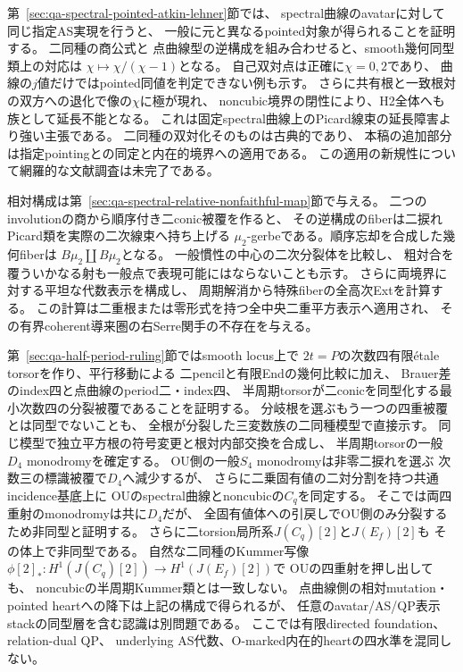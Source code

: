 \documentclass[a4paper,11pt]{ltjsarticle}
\numberwithin{equation}{section}
\theoremstyle{plain}
\theoremstyle{definition}
\theoremstyle{remark}
\begin{document}
第~\ref{sec:qa-spectral-pointed-atkin-lehner}節では、
spectral曲線のavatarに対して同じ指定AS実現を行うと、
一般に元と異なるpointed対象が得られることを証明する。
二同種の商公式\cite[III, Example~4.5]{SilvermanAEC2009}と
点曲線型の逆構成を組み合わせると、smooth幾何同型類上の対応は
$\chi\mapsto\chi/(\chi-1)$となる。
自己双対点は正確に$\chi=0,2$であり、
曲線の$j$値だけではpointed同値を判定できない例も示す。
さらに共有根と一致根対の双方への退化で像の$\chi$に極が現れ、
noncubic境界の閉性により、H2全体へも族として延長不能となる。
これは固定spectral曲線上のPicard線束の延長障害より強い主張である。
二同種の双対化そのものは古典的であり、
本稿の追加部分は指定pointingとの同定と内在的境界への適用である。
この適用の新規性について網羅的な文献調査は未完了である。

相対構成は第~\ref{sec:qa-spectral-relative-nonfaithful-map}節で与える。
二つのinvolutionの商から順序付き二conic被覆を作ると、
その逆構成のfiberは二捩れPicard類を実際の二次線束へ持ち上げる
$\mu_2$-gerbeである。順序忘却を合成した幾何fiberは
$B\mu_2\amalg B\mu_2$となる。
一般慣性の中心の二次分裂体を比較し、
粗対合を覆ういかなる射も一般点で表現可能にはならないことも示す。
さらに両境界に対する平坦な代数表示を構成し、
周期解消から特殊fiberの全高次Extを計算する。
この計算は二重根または零形式を持つ全中央二重平方表示へ適用され、
その有界coherent導来圏の右Serre関手の不存在を与える。


第~\ref{sec:qa-half-period-ruling}節ではsmooth locus上で
$2t=P$の次数四有限étale torsorを作り、平行移動による
二pencilと有限Endの幾何比較に加え、
Brauer差のindex四と点曲線のperiod二・index四、
半周期torsorが二conicを同型化する最小次数四の分裂被覆であることを証明する。
分岐根を選ぶもう一つの四重被覆とは同型でないことも、
全根が分裂した三変数族の二同種模型で直接示す。
同じ模型で独立平方根の符号変更と根対内部交換を合成し、
半周期torsorの一般$D_4$ monodromyを確定する。
OU側の一般$S_4$ monodromyは非零二捩れを選ぶ
次数三の標識被覆で$D_4$へ減少するが、
さらに二乗固有値の二対分割を持つ共通incidence基底上に
OUのspectral曲線とnoncubicの$C_q$を同定する。
そこでは両四重射のmonodromyは共に$D_4$だが、
全固有値体への引戻しでOU側のみ分裂するため非同型と証明する。
さらに二torsion局所系$J(C_q)[2]$と$J(E_f)[2]$も
その体上で非同型である。
自然な二同種のKummer写像
$\phi[2]_*:H^1(J(C_q)[2])\to H^1(J(E_f)[2])$で
OUの四重射を押し出しても、
noncubicの半周期Kummer類とは一致しない。
点曲線側の相対mutation・pointed heartへの降下は上記の構成で得られるが、
任意のavatar/AS/QP表示stackの同型層を含む認識は別問題である。
ここでは有限directed foundation、relation-dual QP、
underlying AS代数、O-marked内在的heartの四水準を混同しない。
\end{document}
